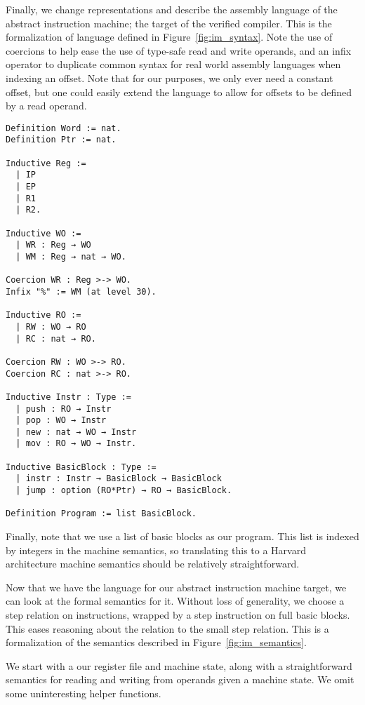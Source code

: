 Finally, we change representations and describe the assembly language of the
abstract instruction machine; the target of the verified compiler. This is the
formalization of language defined in Figure~\ref{fig:im_syntax}. Note the use of
coercions to help ease the use of type-safe read and write operands, and an
infix operator to duplicate common syntax for real world assembly languages when
indexing an offset. Note that for our purposes, we only ever need a constant
offset, but one could easily extend the language to allow for offsets to be
defined by a read operand.  

\begin{verbatim}
Definition Word := nat.
Definition Ptr := nat.

Inductive Reg := 
  | IP
  | EP
  | R1
  | R2.

Inductive WO := 
  | WR : Reg → WO
  | WM : Reg → nat → WO.

Coercion WR : Reg >-> WO.
Infix "%" := WM (at level 30).

Inductive RO := 
  | RW : WO → RO
  | RC : nat → RO.

Coercion RW : WO >-> RO.
Coercion RC : nat >-> RO.

Inductive Instr : Type :=
  | push : RO → Instr
  | pop : WO → Instr
  | new : nat → WO → Instr 
  | mov : RO → WO → Instr.

Inductive BasicBlock : Type :=
  | instr : Instr → BasicBlock → BasicBlock
  | jump : option (RO*Ptr) → RO → BasicBlock.

Definition Program := list BasicBlock.
\end{verbatim}

Finally, note that we use a list of basic blocks as our program. This list is
indexed by integers in the machine semantics, so translating this to a Harvard 
architecture machine semantics should be relatively straightforward. 

Now that we have the language for our abstract instruction machine target, we
can look at the formal semantics for it. Without loss of generality, we choose a
step relation on instructions, wrapped by a step instruction on full basic
blocks. This eases reasoning about the relation to the small step \ce
relation. This is a formalization of the semantics described in
Figure~\ref{fig:im_semantics}. 

We start with a our register file and machine state, along with a
straightforward semantics for reading and writing from operands given a 
machine state. We omit some uninteresting helper functions. 


